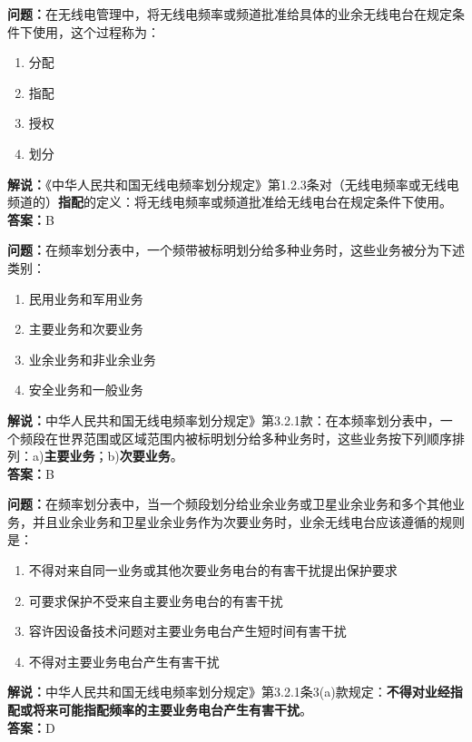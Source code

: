 \bigskip


\noindent\textbf{问题：}在无线电管理中，将无线电频率或频道批准给具体的业余无线电台在规定条件下使用，这个过程称为：
\begin{enumerate}[label=\Alph*), leftmargin=3em]
	\item 分配
	\item 指配
	\item 授权
	\item 划分
\end{enumerate}
\noindent\textbf{解说：}《中华人民共和国无线电频率划分规定》第1.2.3条对（无线电频率或无线电频道的）\textbf{指配}的定义：将无线电频率或频道批准给无线电台在规定条件下使用。\\
\textbf{答案：}B



\bigskip


\noindent\textbf{问题：}在频率划分表中，一个频带被标明划分给多种业务时，这些业务被分为下述类别：
\begin{enumerate}[label=\Alph*), leftmargin=3em]
	\item 民用业务和军用业务
	\item 主要业务和次要业务
	\item 业余业务和非业余业务
	\item 安全业务和一般业务
\end{enumerate}
\noindent\textbf{解说：}中华人民共和国无线电频率划分规定》第3.2.1款：在本频率划分表中，一个频段在世界范围或区域范围内被标明划分给多种业务时，这些业务按下列顺序排列：a)\textbf{主要业务}；b)\textbf{次要业务}。\\\textbf{答案：}B




\bigskip


\noindent\textbf{问题：}在频率划分表中，当一个频段划分给业余业务或卫星业余业务和多个其他业务，并且业余业务和卫星业余业务作为次要业务时，业余无线电台应该遵循的规则是：
\begin{enumerate}[label=\Alph*), leftmargin=3em]
	\item 不得对来自同一业务或其他次要业务电台的有害干扰提出保护要求
	\item 可要求保护不受来自主要业务电台的有害干扰
	\item 容许因设备技术问题对主要业务电台产生短时间有害干扰
	\item 不得对主要业务电台产生有害干扰
\end{enumerate}
\noindent\textbf{解说：}中华人民共和国无线电频率划分规定》第3.2.1条3(a)款规定：\textbf{不得对业经指配或将来可能指配频率的主要业务电台产生有害干扰}。\\
\textbf{答案：}D





